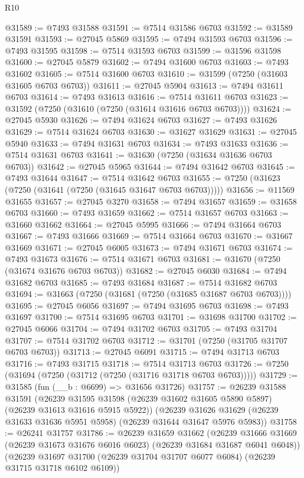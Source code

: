 \begin{lexlean}{R10}
\begin{coremodule}
@31589 := @7493 @31588
@31591 := @7514 @31586 @6703
@31592 := @31589 @31591
@31593 := @27045 @5869
@31595 := @7494 @31593 @6703
@31596 := @7493 @31595
@31598 := @7514 @31593 @6703
@31599 := @31596 @31598
@31600 := @27045 @5879
@31602 := @7494 @31600 @6703
@31603 := @7493 @31602
@31605 := @7514 @31600 @6703
@31610 := @31599 (@7250 (@31603 @31605 @6703 @6703))
@31611 := @27045 @5904
@31613 := @7494 @31611 @6703
@31614 := @7493 @31613
@31616 := @7514 @31611 @6703
@31623 := @31592 (@7250 (@31610 (@7250 (@31614 @31616 @6703 @6703))))
@31624 := @27045 @5930
@31626 := @7494 @31624 @6703
@31627 := @7493 @31626
@31629 := @7514 @31624 @6703
@31630 := @31627 @31629
@31631 := @27045 @5940
@31633 := @7494 @31631 @6703
@31634 := @7493 @31633
@31636 := @7514 @31631 @6703
@31641 := @31630 (@7250 (@31634 @31636 @6703 @6703))
@31642 := @27045 @5965
@31644 := @7494 @31642 @6703
@31645 := @7493 @31644
@31647 := @7514 @31642 @6703
@31655 := @7250 (@31623 (@7250 (@31641 (@7250 (@31645 @31647 @6703 @6703)))))
@31656 := @11569 @31655
@31657 := @27045 @3270
@31658 := @7494 @31657
@31659 := @31658 @6703
@31660 := @7493 @31659
@31662 := @7514 @31657 @6703
@31663 := @31660 @31662
@31664 := @27045 @5995
@31666 := @7494 @31664 @6703
@31667 := @7493 @31666
@31669 := @7514 @31664 @6703
@31670 := @31667 @31669
@31671 := @27045 @6005
@31673 := @7494 @31671 @6703
@31674 := @7493 @31673
@31676 := @7514 @31671 @6703
@31681 := @31670 (@7250 (@31674 @31676 @6703 @6703))
@31682 := @27045 @6030
@31684 := @7494 @31682 @6703
@31685 := @7493 @31684
@31687 := @7514 @31682 @6703
@31694 := @31663 (@7250 (@31681 (@7250 (@31685 @31687 @6703 @6703))))
@31695 := @27045 @6056
@31697 := @7494 @31695 @6703
@31698 := @7493 @31697
@31700 := @7514 @31695 @6703
@31701 := @31698 @31700
@31702 := @27045 @6066
@31704 := @7494 @31702 @6703
@31705 := @7493 @31704
@31707 := @7514 @31702 @6703
@31712 := @31701 (@7250 (@31705 @31707 @6703 @6703))
@31713 := @27045 @6091
@31715 := @7494 @31713 @6703
@31716 := @7493 @31715
@31718 := @7514 @31713 @6703
@31726 := @7250 (@31694 (@7250 (@31712 (@7250 (@31716 @31718 @6703 @6703)))))
@31729 := @31585 (fun (__b : @6699) => @31656 @31726)
@31757 := @26239
    @31588
    @31591
    (@26239 @31595 @31598 (@26239 @31602 @31605 @5890 @5897) (@26239 @31613 @31616 @5915 @5922))
    (@26239 @31626 @31629 (@26239 @31633 @31636 @5951 @5958) (@26239 @31644 @31647 @5976 @5983))
@31758 := @26241 @31757
@31786 := @26239
    @31659
    @31662
    (@26239 @31666 @31669 (@26239 @31673 @31676 @6016 @6023) (@26239 @31684 @31687 @6041 @6048))
    (@26239 @31697 @31700 (@26239 @31704 @31707 @6077 @6084) (@26239 @31715 @31718 @6102 @6109))

\end{coremodule}
\end{lexlean}
